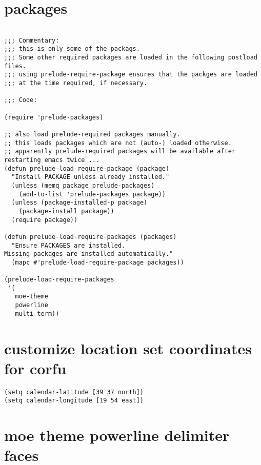 \documentclass[11pt]{article}
\author{IOANNIS ZANNOS}
\date{\today}
\title{}
\begin{document}
\tableofcontents


\section{packages}
\label{sec:org8751c3a}

\begin{verbatim}

;;; Commentary:
;;; this is only some of the packags.
;;; Some other required packages are loaded in the following postload files.
;;; using prelude-require-package ensures that the packges are loaded
;;; at the time required, if necessary.

;;; Code:

(require 'prelude-packages)

;; also load prelude-required packages manually.
;; this loads packages which are not (auto-) loaded otherwise.
;; apparently prelude-required packages will be available after restarting emacs twice ...
(defun prelude-load-require-package (package)
  "Install PACKAGE unless already installed."
  (unless (memq package prelude-packages)
    (add-to-list 'prelude-packages package))
  (unless (package-installed-p package)
    (package-install package))
  (require package))

(defun prelude-load-require-packages (packages)
  "Ensure PACKAGES are installed.
Missing packages are installed automatically."
  (mapc #'prelude-load-require-package packages))

(prelude-load-require-packages
 '(
   moe-theme
   powerline
   multi-term))

\end{verbatim}

\section{customize location set coordinates for corfu}
\label{sec:org887d244}

\begin{verbatim}
(setq calendar-latitude [39 37 north])
(setq calendar-longitude [19 54 east])
\end{verbatim}
\section{moe theme powerline delimiter faces}
\label{sec:org111a566}
\end{document}
